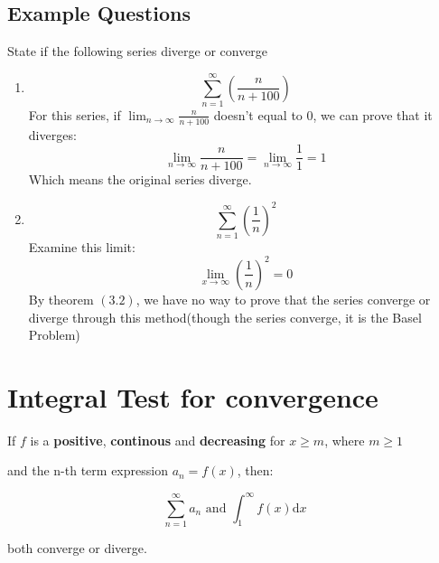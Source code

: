 \documentclass{article}
\numberwithin{equation}{section}
\begin{document}
\subsection{Example Questions}
State if the following series diverge or converge
\begin{enumerate}
    \item \[\sum_{n = 1}^{\infty} \left(\frac{n}{n + 100}\right)\]
    For this series, if $\lim_{n\to \infty} \frac{n}{n+100}$ doesn't equal to 0, we can prove that it diverges:
    \[
        \lim_{n\to \infty} \frac{n}{n+100} = \lim_{n\to \infty} \frac{1}{1} = 1
    \]
    Which means the original series diverge.

    \item \[\sum_{n = 1}^{\infty} \left(\frac{1}{n}\right)^2\]
    Examine this limit: 
    \[
        \lim_{x\to \infty} \left(\frac{1}{n}\right)^2 = 0
    \]
    By theorem $(3.2)$, we have no way to prove that the series converge or diverge through this method(though the series converge, it is the Basel Problem)
\end{enumerate}

\newpage
\section{Integral Test for convergence}
If $f$ is a \textbf{positive}, \textbf{continous} and \textbf{decreasing} for $x \geq m$, where $m \geq 1$

and the n-th term expression $a_n = f(x)$, then:

\begin{equation}
    \sum_{n = 1}^{\infty} a_n \text{ and } \int_{1}^{\infty} f(x) \mathrm{d}x
\end{equation}

both converge or diverge.
\end{document}
